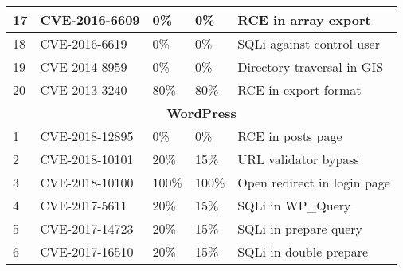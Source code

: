 \begin{table}[]
\begin{adjustbox}{max width=0.65\textwidth}
\begin{tabular}{|lllll|}
    \multicolumn{1}{|l|}{17}          & \multicolumn{1}{l|}{CVE-2016-6609}    & \multicolumn{1}{l|}{0\%}                  & \multicolumn{1}{l|}{0\%}               & RCE in array export             \\ \hline
    \multicolumn{1}{|l|}{18}          & \multicolumn{1}{l|}{CVE-2016-6619}    & \multicolumn{1}{l|}{0\%}                  & \multicolumn{1}{l|}{0\%}               & SQLi against control user       \\ \hline
    \multicolumn{1}{|l|}{19}          & \multicolumn{1}{l|}{CVE-2014-8959}    & \multicolumn{1}{l|}{0\%}                  & \multicolumn{1}{l|}{0\%}               & Directory traversal in GIS      \\ \hline
    \multicolumn{1}{|l|}{20}          & \multicolumn{1}{l|}{CVE-2013-3240}    & \multicolumn{1}{l|}{80\%}                 & \multicolumn{1}{l|}{80\%}              & RCE in export format            \\ \hline
    \multicolumn{5}{|c|}{\textbf{WordPress}}                                                                                                                                                                 \\ \hline
    \multicolumn{1}{|l|}{1}           & \multicolumn{1}{l|}{CVE-2018-12895}   & \multicolumn{1}{l|}{0\%}                  & \multicolumn{1}{l|}{0\%}               & RCE in posts page                       \\ \hline
    \multicolumn{1}{|l|}{2}           & \multicolumn{1}{l|}{CVE-2018-10101}   & \multicolumn{1}{l|}{20\%}                 & \multicolumn{1}{l|}{15\%}              & URL validator bypass                    \\ \hline
    \multicolumn{1}{|l|}{3}           & \multicolumn{1}{l|}{CVE-2018-10100}   & \multicolumn{1}{l|}{100\%}                & \multicolumn{1}{l|}{100\%}             & Open redirect in login page             \\ \hline
    \multicolumn{1}{|l|}{4}           & \multicolumn{1}{l|}{CVE-2017-5611}    & \multicolumn{1}{l|}{20\%}                 & \multicolumn{1}{l|}{15\%}              & SQLi in WP\_Query                       \\ \hline
    \multicolumn{1}{|l|}{5}           & \multicolumn{1}{l|}{CVE-2017-14723}   & \multicolumn{1}{l|}{20\%}                 & \multicolumn{1}{l|}{15\%}              & SQLi in prepare query                   \\ \hline
    \multicolumn{1}{|l|}{6}           & \multicolumn{1}{l|}{CVE-2017-16510}   & \multicolumn{1}{l|}{20\%}                 & \multicolumn{1}{l|}{15\%}              & SQLi in double prepare                  \\ \hline

\end{tabular}
\end{adjustbox}
\end{table}
